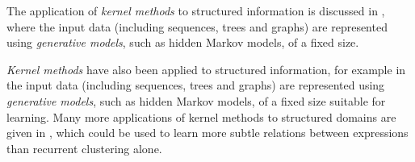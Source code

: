 The application of \emph{kernel methods} to structured information is discussed
in \cite{Gartner2003}, where the input data (including sequences, trees and
graphs) are represented using \emph{generative models}, such as hidden Markov
models, of a fixed size.

\emph{Kernel methods} have also been applied to structured information, for
example in \cite{Gartner2003} the input data (including sequences, trees and
graphs) are represented using \emph{generative models}, such as hidden Markov
models, of a fixed size suitable for learning. Many more applications of kernel
methods to structured domains are given in \cite{bakir2007predicting}, which
could be used to learn more subtle relations between expressions than recurrent
clustering alone.



\cite{Gartner2003}
\cite{Oveisi.Oveisi.Erfanian.ea:2012}
\cite{bakir2007predicting}
\cite{conf/ijcai/Plate91}
\cite{goller1996learning}
\cite{kwasny1995tail}
\cite{pollack1990recursive}
\cite{zanzotto2012distributed}
